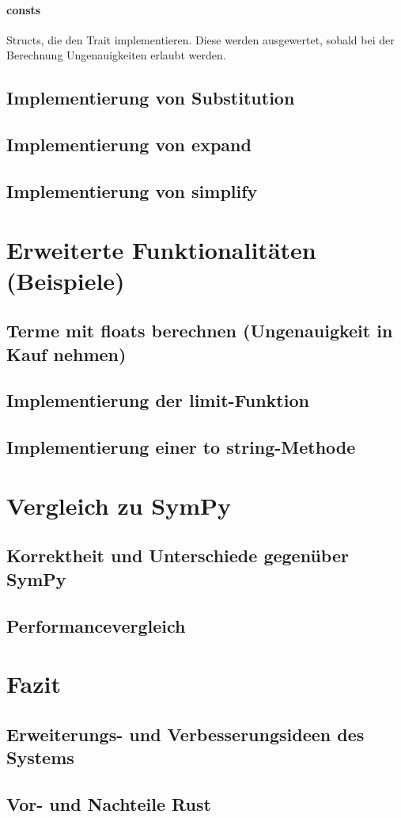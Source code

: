 \documentclass[11pt,a4paper, ngerman]{article}
\begin{document}
\paragraph{consts} Structs, die den Trait  implementieren. Diese werden ausgewertet, sobald bei der Berechnung Ungenauigkeiten erlaubt werden.

\subsection{Implementierung von Substitution}
\subsection{Implementierung von expand}
\subsection{Implementierung von simplify}

\newpage

\section{Erweiterte Funktionalitäten (Beispiele)}
\subsection{Terme mit floats berechnen (Ungenauigkeit in Kauf nehmen)}
\subsection{Implementierung der limit-Funktion}
\subsection{Implementierung einer to string-Methode}

\newpage

\section{Vergleich zu SymPy}
\subsection{Korrektheit und Unterschiede gegenüber SymPy}
\subsection{Performancevergleich}

\newpage

\section{Fazit}
\subsection{Erweiterungs- und Verbesserungsideen des Systems}
\subsection{Vor- und Nachteile Rust}


\newpage

\raggedright

\end{document}

